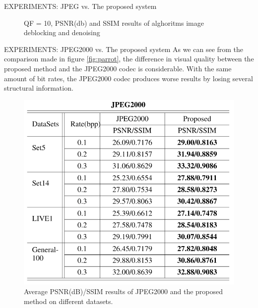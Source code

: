 \documentclass[10pt]{beamer}
\begin{document}
\begin{frame}{EXPERIMENTS: JPEG vs. The proposed system}
\begin{minipage}{\linewidth}
\begin{minipage}{0.45\linewidth}
\begin{figure}[htbp]
                \caption{QF = 10, PSNR(db) and SSIM results of alghoritms image deblocking and denoising}
                \centering
            \end{figure}
        \end{minipage}
    \end{minipage}
\end{frame}

\begin{frame}{EXPERIMENTS: JPEG2000 vs. The proposed system}
    As we can see from the comparison made in figure \ref{fig:parrot}, the difference in  
    visual quality between the proposed method and the JPEG2000 codec is 
    considerable. With the same amount of bit rates, the JPEG2000 codec 
    produces worse results by losing several structural information. 
    \begin{minipage}{\linewidth}
        \centering
        \begin{minipage}{0.45\linewidth}
            \begin{figure}[H]
                \includegraphics[width = 1 \linewidth]{images/paper3/JPEG2000.png}                
                \caption{Average PSNR(dB)/SSIM results of JPEG2000 and the proposed method on different datasets.}
            \end{figure}
        \end{minipage}
        \hspace{0.05\linewidth}
        \begin{minipage}{0.45\linewidth}

\end{minipage}
\end{minipage}
\end{frame}
\end{document}
